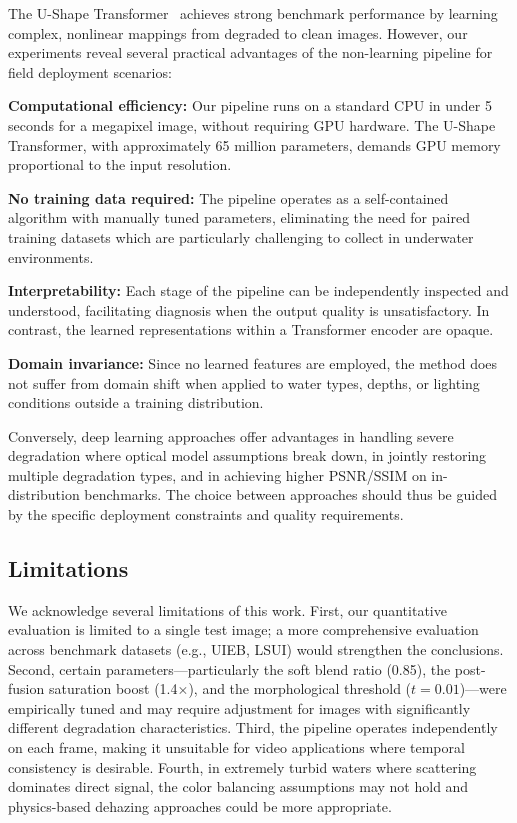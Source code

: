 \documentclass[conference]{IEEEtran}
\begin{document}
The U-Shape Transformer~\cite{peng2023ushape} achieves strong benchmark performance by learning complex, nonlinear mappings from degraded to clean images. However, our experiments reveal several practical advantages of the non-learning pipeline for field deployment scenarios:

\textbf{Computational efficiency:} Our pipeline runs on a standard CPU in under 5 seconds for a megapixel image, without requiring GPU hardware. The U-Shape Transformer, with approximately 65 million parameters, demands GPU memory proportional to the input resolution.

\textbf{No training data required:} The pipeline operates as a self-contained algorithm with manually tuned parameters, eliminating the need for paired training datasets which are particularly challenging to collect in underwater environments.

\textbf{Interpretability:} Each stage of the pipeline can be independently inspected and understood, facilitating diagnosis when the output quality is unsatisfactory. In contrast, the learned representations within a Transformer encoder are opaque.

\textbf{Domain invariance:} Since no learned features are employed, the method does not suffer from domain shift when applied to water types, depths, or lighting conditions outside a training distribution.

Conversely, deep learning approaches offer advantages in handling severe degradation where optical model assumptions break down, in jointly restoring multiple degradation types, and in achieving higher PSNR/SSIM on in-distribution benchmarks. The choice between approaches should thus be guided by the specific deployment constraints and quality requirements.

\subsection{Limitations}

We acknowledge several limitations of this work. First, our quantitative evaluation is limited to a single test image; a more comprehensive evaluation across benchmark datasets (e.g., UIEB, LSUI) would strengthen the conclusions. Second, certain parameters---particularly the soft blend ratio (0.85), the post-fusion saturation boost (1.4$\times$), and the morphological threshold ($t = 0.01$)---were empirically tuned and may require adjustment for images with significantly different degradation characteristics. Third, the pipeline operates independently on each frame, making it unsuitable for video applications where temporal consistency is desirable. Fourth, in extremely turbid waters where scattering dominates direct signal, the color balancing assumptions may not hold and physics-based dehazing approaches could be more appropriate.
\end{document}

